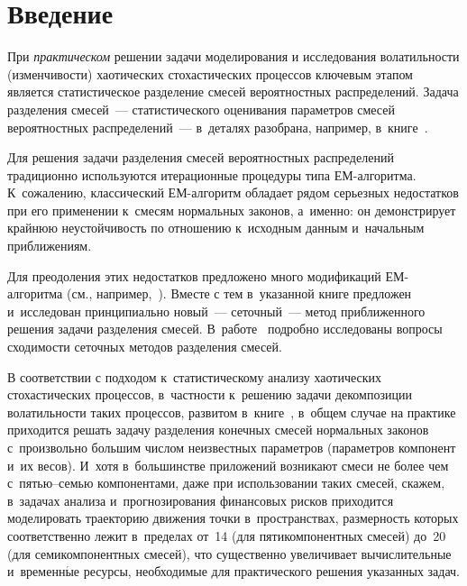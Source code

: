 \vspace*{1pt}





\thispagestyle{headings}

\begin{multicols}{2}

\label{st\stat}

\section{Введение}

При {\it практическом} решении задачи моделирования и исследования
волатильности (изменчивости) хаотических стохастических процессов
ключевым этапом является статистическое разделение смесей
вероятностных распределений. Задача разделения смесей~---
статистического оценивания параметров смесей вероятностных
распределений~--- в~деталях разобрана, например, в~книге~\cite{k2011}.

Для решения задачи разделения смесей вероятностных распределений
традиционно используются итерационные процедуры типа ЕМ-ал\-го\-рит\-ма.
К~сожалению, классический ЕМ-ал\-го\-ритм обладает рядом серьезных
недостатков при его применении к~смесям нормальных законов, а~именно:
он демонстрирует крайнюю неустойчивость по отношению к~исходным
данным и~начальным приближениям.

Для преодоления этих недостатков
предложено много модификаций ЕМ-ал\-го\-рит\-ма (см., например,~\cite{k2011}).
Вместе с тем в~указанной книге предложен и~исследован
принципиально новый~--- сеточный~--- метод приближенного решения
задачи разделения смесей. В~работе~\cite{n2013} подробно исследованы
вопросы сходимости сеточных методов разделения смесей.

В соответствии с подходом к~статистическому анализу хаотических
стохастических процессов, в~частности к~решению задачи декомпозиции
волатильности таких процессов, развитом в~книге~\cite{k2011},
в~общем случае на практике приходится решать задачу разделения
конечных смесей нормальных законов с~произвольно большим числом
неизвестных параметров (параметров компонент и~их весов).
И~хотя в~большинстве приложений возникают смеси не более чем с~пятью--семью
компонентами, даже при использовании таких смесей, скажем, в~задачах
анализа и~прогнозирования финансовых рисков приходится моделировать
траекторию движения точки в~пространствах, размерность которых
соответственно лежит в~пределах от~14 (для пятикомпонентных смесей)
до~20 (для семикомпонентных смесей), что существенно увеличивает
вычислительные и~временн$\acute{\mbox{ы}}$е ресурсы, необходимые для практического
решения указанных задач.


\end{multicols}
